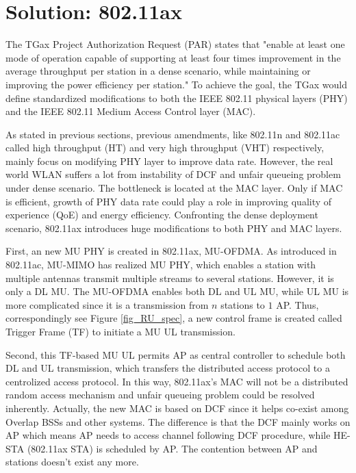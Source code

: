 \section{Solution: 802.11ax}
The TGax Project Authorization Request (PAR) \cite{802.11ax_par} states that "enable at least one mode of operation capable of supporting at least four times improvement in the average throughput per station in a dense scenario, while maintaining or improving the power efficiency per station."
To achieve the goal, the TGax would define standardized modifications to both the IEEE 802.11 physical layers (PHY) and the IEEE 802.11 Medium Access Control layer (MAC).

As stated in previous sections, previous amendments, like 802.11n and 802.11ac called high throughput (HT) and very high throughput (VHT) respectively, mainly focus on modifying PHY layer to improve data rate\cite{perahia2013next}. 
However, the real world WLAN suffers a lot from instability of DCF and unfair queueing problem under dense scenario. 
The bottleneck is located at the MAC layer.
Only if MAC is efficient, growth of PHY data rate could play a role in improving quality of experience (QoE) and energy efficiency.
Confronting the dense deployment scenario, 802.11ax introduces huge modifications to both PHY and MAC layers.

First, an new MU PHY is created in 802.11ax, MU-OFDMA. 
As introduced in 802.11ac, MU-MIMO has realized MU PHY, which enables a station with multiple antennas transmit multiple streams to several stations.
However, it is only a DL MU.
The MU-OFDMA enables both DL and UL MU, while UL MU is more complicated since it is a transmission from $n$ stations to $1$ AP.
Thus, correspondingly see Figure \ref{fig_RU_spec}, a new control frame is created called Trigger Frame (TF) to initiate a MU UL transmission\cite{draft_ax}.

Second, this TF-based MU UL permits AP as central controller to schedule both DL and UL transmission, which transfers the distributed access protocol to a centrolized access protocol. 
In this way, 802.11ax's MAC will not be a distributed random access mechanism and unfair queueing problem could be resolved inherently.
Actually, the new MAC is based on DCF since it helps co-exist among Overlap BSSs and other systems. 
The difference is that the DCF mainly works on AP which means AP needs to access channel following DCF procedure, while HE-STA (802.11ax STA) is scheduled by AP. 
The contention between AP and stations doesn't exist any more.


